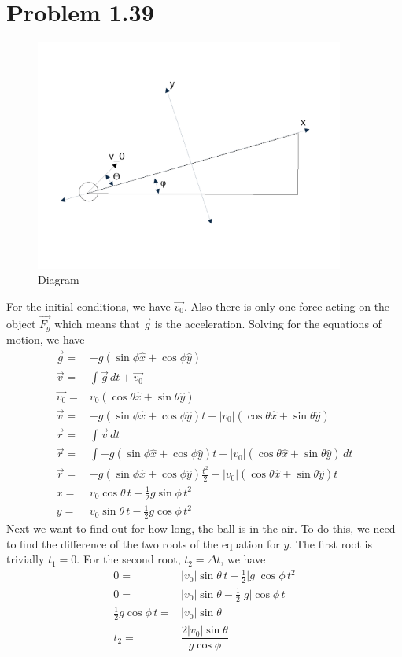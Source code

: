 \documentclass[12pt, a4paper]{article}
\begin{document}
\pagebreak
\section*{Problem 1.39}
\begin{figure}[h]
  \includegraphics[width=4in]{fig_1.pdf}
  \caption{Diagram}
  \label{fig_1}
\end{figure}
For the initial conditions, we have $\vec{v_0}$. Also there is only one force acting on the object $\vec{F_g}$ which means that $\vec{g}$ is the acceleration. Solving for the equations of motion, we have
\begin{align*}
\vec{g} =& -g(\sin\phi \hat{x}+\cos\phi \hat{y})
\\
\vec{v} =& \int \vec{g} \,dt + \vec{v_0}
\\
\vec{v_0} =& v_0(\cos\theta\hat{x}+\sin\theta\hat{y})
\\
\vec{v} =& -g(\sin\phi \hat{x}+\cos\phi \hat{y})t + |v_0|(\cos\theta\hat{x}+\sin\theta\hat{y})
\\
\vec{r} =& \int \vec{v} \,dt
\\
\vec{r} =& \int -g(\sin\phi \hat{x}+\cos\phi \hat{y})t + |v_0|(\cos\theta\hat{x}+\sin\theta\hat{y}) \, dt
\\
\vec{r} =& -g(\sin\phi \hat{x}+\cos\phi \hat{y})\frac{t^2}{2} + |v_0|(\cos\theta\hat{x}+\sin\theta\hat{y})t
\\
x =& v_0\cos\theta \,t - \tfrac{1}{2}g\sin\phi \,t^2
\\
y =& v_0\sin\theta \,t - \tfrac{1}{2}g\cos\phi \,t^2
\end{align*}
Next we want to find out for how long, the ball is in the air. To do this, we need to find the difference of the two roots of the equation for $y$. The first root is trivially $t_1=0$. For the second root, $t_2 = \Delta t$, we have
\begin{align*}
0 =& |v_0|\sin\theta \,t - \tfrac{1}{2}|g|\cos\phi \,t^2
\\
0 =& |v_0|\sin\theta  - \tfrac{1}{2}|g|\cos\phi \,t
\\
\tfrac{1}{2}g\cos\phi \,t =& |v_0|\sin\theta
\\
t_2 =& \dfrac{2|v_0|\sin\theta}{g\cos\phi}
\end{align*}
\end{document}
